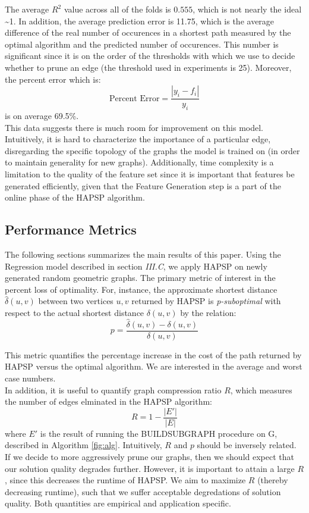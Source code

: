 \documentclass[10.5pt,journal]{IEEEtran}
\begin{document}
		The average $R^2$ value across all of the folds is $0.555$, which is not nearly the ideal
		\textasciitilde 1. In addition, the average prediction error is 11.75, which is the average
		difference of the real number of occurences in a shortest path measured by the optimal algorithm
		and the predicted number of occurences. This number is significant since it is on the order
		of the thresholds with which we use to decide whether to prune an edge (the threshold used in
		experiments is 25). Moreover, the percent error which is:
			\[\mbox{Percent Error} = \frac{|y_i - f_i|}{y_i}\]
		is on average 69.5\%. \\
		
		This data suggests there is much room for improvement on this model.
		Intuitively, it is hard to characterize the importance of a particular edge, disregarding the
		specific topology of the graphs the model is trained on (in order to maintain generality for
		new graphs). Additionally, time complexity is a limitation to the quality of the feature set since it is
		important that features be generated efficiently, given that the Feature Generation step
		is a part of the online phase of the HAPSP algorithm.
	
	\subsection{Performance Metrics}
		The following sections summarizes the main results of this paper. Using the Regression model described
		in section {\it{III.C}}, we apply HAPSP on newly generated random geometric graphs. 
		The primary metric of interest in the percent loss of optimality. For, instance, the 
		approximate shortest distance $\hat{\delta}(u,v)$ between two vertices $u,v$ returned by
		HAPSP is {\it{p-suboptimal}} with respect to the actual shortest distance $\delta(u,v)$
		by the relation:
			\[p=\frac{\hat{\delta}(u,v) - \delta(u,v)}{\delta(u,v)}\]
			
		This metric quantifies the percentage increase in the cost of the path returned by HAPSP versus
		the optimal algorithm. We are interested in the average and worst case numbers. \\
		
		In addition, it is useful to quantify graph compression ratio $R$, which measures the 
		number of edges elminated in the HAPSP algorithm:
			\[R = 1 - \frac{|E'|}{|E|}\]
		where $E'$ is the result of running the BUILDSUBGRAPH procedure on G, described in
		Algorithm \ref{fig:alg}. Intuitively, $R$ and $p$ should be inversely related. If we
		decide to more aggressively prune our graphs, then we should expect that our solution quality
		degrades further. However, it is important to attain a large $R$, since this decreases
		the runtime of HAPSP. We aim to maximize $R$ (thereby decreasing runtime),
		such that we suffer acceptable degredations of solution quality. Both quantities are empirical
		and application specific. \\
		
\end{document}
